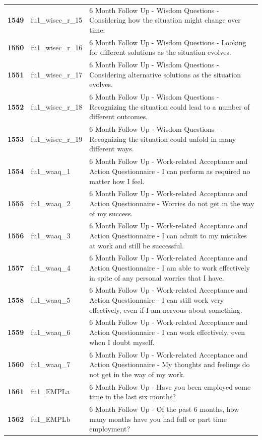 \documentclass[
  letterpaper,
  DIV=11,
  numbers=noendperiod]{scrartcl}
\begin{document}
\begin{longtable}[t]{>{}cll}
\textbf{1549} & fu1\_wisec\_r\_15 & 6 Month Follow Up - Wisdom Questions - Considering how the situation might change over time.\\
\textbf{1550} & fu1\_wisec\_r\_16 & 6 Month Follow Up - Wisdom Questions - Looking for different solutions as the situation evolves.\\
\addlinespace
\textbf{1551} & fu1\_wisec\_r\_17 & 6 Month Follow Up - Wisdom Questions - Considering alternative solutions as the situation evolves.\\
\textbf{1552} & fu1\_wisec\_r\_18 & 6 Month Follow Up - Wisdom Questions - Recognizing the situation could lead to a number of different outcomes.\\
\textbf{1553} & fu1\_wisec\_r\_19 & 6 Month Follow Up - Wisdom Questions - Recognizing the situation could unfold in many different ways.\\
\textbf{1554} & fu1\_waaq\_1 & 6 Month Follow Up - Work-related Acceptance and Action Questionnaire - I can perform as required no matter how I feel.\\
\textbf{1555} & fu1\_waaq\_2 & 6 Month Follow Up - Work-related Acceptance and Action Questionnaire - Worries do not get in the way of my success.\\
\addlinespace
\textbf{1556} & fu1\_waaq\_3 & 6 Month Follow Up - Work-related Acceptance and Action Questionnaire - I can admit to my mistakes at work and still be successful.\\
\textbf{1557} & fu1\_waaq\_4 & 6 Month Follow Up - Work-related Acceptance and Action Questionnaire - I am able to work effectively in spite of any personal worries that I have.\\
\textbf{1558} & fu1\_waaq\_5 & 6 Month Follow Up - Work-related Acceptance and Action Questionnaire - I can still work very effectively, even if I am nervous about something.\\
\textbf{1559} & fu1\_waaq\_6 & 6 Month Follow Up - Work-related Acceptance and Action Questionnaire - I can work effectively, even when I doubt myself.\\
\textbf{1560} & fu1\_waaq\_7 & 6 Month Follow Up - Work-related Acceptance and Action Questionnaire - My thoughts and feelings do not get in the way of my work.\\
\addlinespace
\textbf{1561} & fu1\_EMPLa & 6 Month Follow Up - Have you been employed some time in the last six months?\\
\textbf{1562} & fu1\_EMPLb & 6 Month Follow Up - Of the past 6 months, how many months have you had full or part time employment?\\

\end{longtable}
\end{document}
